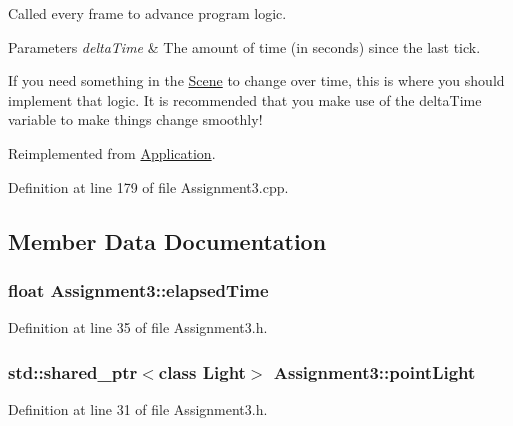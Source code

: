 Called every frame to advance program logic. 


\begin{DoxyParams}{Parameters}
{\em delta\+Time} & The amount of time (in seconds) since the last tick.\\
\hline
\end{DoxyParams}
If you need something in the \hyperlink{class_scene}{Scene} to change over time, this is where you should implement that logic. It is recommended that you make use of the delta\+Time variable to make things change smoothly! 

Reimplemented from \hyperlink{class_application_a0800afd5651153d31fa775a8048d14dd}{Application}.



Definition at line 179 of file Assignment3.\+cpp.



\subsection{Member Data Documentation}
\hypertarget{class_assignment3_ac404a56071e2ab5e14289900b9034438}{}
\subsubsection[{elapsed\+Time}]{\setlength{\rightskip}{0pt plus 5cm}float Assignment3\+::elapsed\+Time\hspace{0.3cm}{\ttfamily [private]}}\label{class_assignment3_ac404a56071e2ab5e14289900b9034438}


Definition at line 35 of file Assignment3.\+h.

\hypertarget{class_assignment3_ad1cf5a76d62b5a1ed17e66c31e0feb98}{}
\subsubsection[{point\+Light}]{\setlength{\rightskip}{0pt plus 5cm}std\+::shared\+\_\+ptr$<$class {\bf Light}$>$ Assignment3\+::point\+Light\hspace{0.3cm}{\ttfamily [private]}}\label{class_assignment3_ad1cf5a76d62b5a1ed17e66c31e0feb98}


Definition at line 31 of file Assignment3.\+h.

\hypertarget{class_assignment3_ad6ea1201b058dbac9fd0e7b67015cf61}{}
